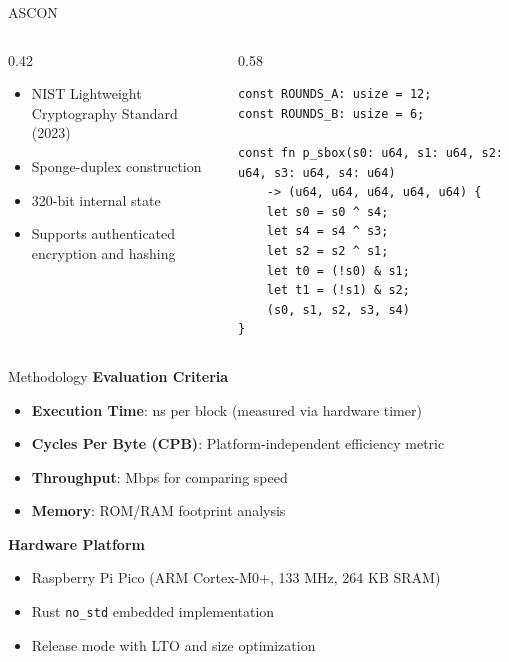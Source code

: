 \documentclass[aspectratio=169]{beamer}
\begin{document}
\begin{frame}[fragile]{ASCON}
\begin{columns}
\begin{column}{0.42\textwidth}
\begin{itemize}
    \item NIST Lightweight Cryptography Standard (2023)
    \item Sponge-duplex construction
    \item 320-bit internal state
    \item Supports authenticated encryption and hashing
\end{itemize}
\end{column}
\begin{column}{0.58\textwidth}
\begin{lstlisting}
const ROUNDS_A: usize = 12;
const ROUNDS_B: usize = 6;

const fn p_sbox(s0: u64, s1: u64, s2: u64, s3: u64, s4: u64)
    -> (u64, u64, u64, u64, u64) {
    let s0 = s0 ^ s4;
    let s4 = s4 ^ s3;
    let s2 = s2 ^ s1;
    let t0 = (!s0) & s1;
    let t1 = (!s1) & s2;
    (s0, s1, s2, s3, s4)
}
\end{lstlisting}
\end{column}
\end{columns}
\end{frame}

\begin{frame}{Methodology}
\textbf{Evaluation Criteria}
\begin{itemize}
    \item \textbf{Execution Time}: ns per block (measured via hardware timer)
    \item \textbf{Cycles Per Byte (CPB)}: Platform-independent efficiency metric
    \item \textbf{Throughput}: Mbps for comparing speed
    \item \textbf{Memory}: ROM/RAM footprint analysis
\end{itemize}

\vspace{0.3cm}
\textbf{Hardware Platform}
\begin{itemize}
    \item Raspberry Pi Pico (ARM Cortex-M0+, 133 MHz, 264 KB SRAM)
    \item Rust \texttt{no\_std} embedded implementation
    \item Release mode with LTO and size optimization
\end{itemize}
\end{frame}
\end{document}
